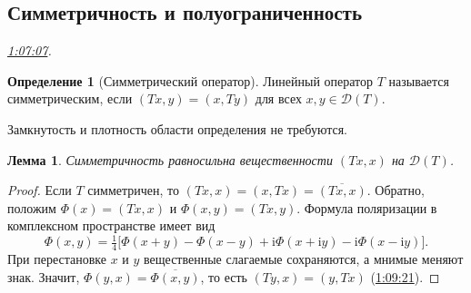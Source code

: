 \documentclass[11pt,a4paper]{article}
\theoremstyle{plain}
\newtheorem{lemma}[theorem]{Лемма}
\theoremstyle{definition}
\newtheorem{definition}[theorem]{Определение}
\newcommand{\Dom}{\mathcal D}
\newcommand{\ii}{\mathrm i}
\newcommand{\at}[3]{\href{https://www.youtube.com/watch?v=#1&t=#2s}{#3}}
\newcommand{\topic}[2]{\Needspace{5\baselineskip}\subsection*{#1}\noindent\emph{#2.}\par\nobreak\smallskip}
\begin{document}
\topic{Симметричность и полуограниченность}{\at{pe5XWL9wtg4}{4027}{1:07:07}}
\begin{definition}[Симметрический оператор]
Линейный оператор $T$ называется симметрическим, если
$(Tx,y)=(x,Ty)$ для всех $x,y\in\Dom(T)$.
\end{definition}
Замкнутость и плотность области определения не требуются.
\begin{lemma}
Симметричность равносильна вещественности $(Tx,x)$ на
$\Dom(T)$.
\end{lemma}
\begin{proof}
Если $T$ симметричен, то $(Tx,x)=(x,Tx)=\overline{(Tx,x)}$.
Обратно, положим $\Phi(x)=(Tx,x)$ и $\Phi(x,y)=(Tx,y)$.
Формула поляризации в комплексном пространстве имеет вид
\[
 \Phi(x,y)=\tfrac14\bigl[
 \Phi(x+y)-\Phi(x-y)+\ii\Phi(x+\ii y)-\ii\Phi(x-\ii y)\bigr].
\]
При перестановке $x$ и $y$ вещественные слагаемые сохраняются,
а мнимые меняют знак. Значит,
$\Phi(y,x)=\overline{\Phi(x,y)}$, то есть $(Ty,x)=(y,Tx)$
(\at{pe5XWL9wtg4}{4161}{1:09:21}).
\end{proof}
\end{document}
